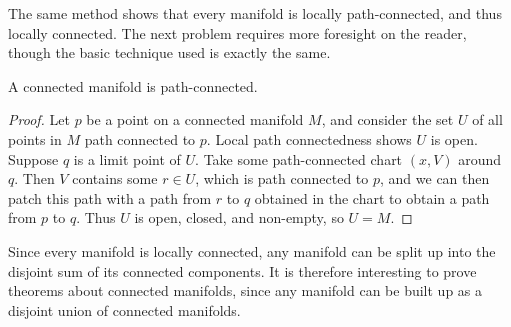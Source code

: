 The same method shows that every manifold is locally path-connected, and thus locally connected. The next problem requires more foresight on the reader, though the basic technique used is exactly the same.

\begin{theorem}
    A connected manifold is path-connected.
\end{theorem}
\begin{proof}
    Let $p$ be a point on a connected manifold $M$, and consider the set $U$ of all points in $M$ path connected to $p$. Local path connectedness shows $U$ is open. Suppose $q$ is a limit point of $U$. Take some path-connected chart $(x,V)$ around $q$. Then $V$ contains some $r \in U$, which is path connected to $p$, and we can then patch this path with a path from $r$ to $q$ obtained in the chart to obtain a path from $p$ to $q$. Thus $U$ is open, closed, and non-empty, so $U = M$.
\end{proof}

Since every manifold is locally connected, any manifold can be split up into the disjoint sum of its connected components. It is therefore interesting to prove theorems about connected manifolds, since any manifold can be built up as a disjoint union of connected manifolds.

